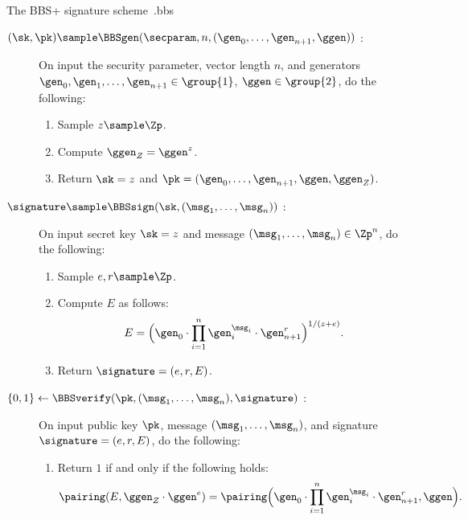 \begin{primitivebox}{The BBS+ signature scheme~\cite{SCN:AuSusMu06}.}{bbs}

  \begin{description}

    \item[$(\sk,\pk) \sample \BBSgen(\secparam, n, (\gen_0,\ldots,\gen_{n+1},
\ggen))$ :] On input the security parameter, vector length $n$, and generators
$\gen_0,\gen_1, \ldots, \gen_{n+1} \in \group{1}$, $\ggen \in \group{2}$, do the
following:

      \begin{enumerate}

	\item Sample $z \sample \Zp$.

	\item Compute $\ggen_Z = \ggen^z$.

	\item Return $\sk = z$ and $\pk = (\gen_0, \ldots, \gen_{n+1}, \ggen,
\ggen_Z)$.

      \end{enumerate}

    \item[$\signature \sample \BBSsign(\sk,(\msg_1, \ldots, \msg_n))$ :] On
input secret key $\sk = z$ and message $(\msg_1, \ldots, \msg_n) \in
\Zp^n$, do the following:

      \begin{enumerate}

	\item Sample $e,r \sample \Zp$.

	\item Compute $E$ as follows:
	\begin{equation*}
	  E = \Big(\gen_0 \cdot \prod_{i=1}^{n} \gen_i^{\msg_i} \cdot
\gen_{n+1}^{r}\Big)^{1/(z+e)}.
	\end{equation*}

	\item Return $\signature = (e, r, E)$.

      \end{enumerate}

    \item[$\{0,1\} \leftarrow \BBSverify(\pk,(\msg_1, \ldots, \msg_n),
\signature)$ :] On input public key $\pk$, message $(\msg_1, \ldots, \msg_n)$,
and signature $\signature = (e,r,E)$, do the following:

      \begin{enumerate}

	\item Return $1$ if and only if the following holds:
	\begin{equation*}
	  \pairing(E,\ggen_Z\cdot\ggen^{e}) = \pairing\Big(\gen_0 \cdot
\prod_{i=1}^{n} \gen_i^{\msg_i} \cdot \gen_{n+1}^{r}, \ggen\Big).
	\end{equation*}

      \end{enumerate}

  \end{description}

\end{primitivebox}


